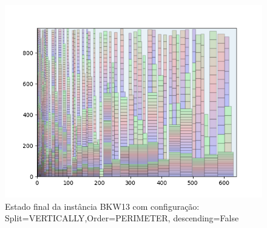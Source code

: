 \begin{figure}[H]
    \centering
    \caption[]{Estado final da instância BKW13 com configuração: Split=VERTICALLY,Order=PERIMETER, descending=False}
    \label{fig:bkw13-vertically-perimeter-false}
    \includegraphics[scale=0.5]{output/figures/bkw/bkw13/vertically/perimeter/false/0000}
\end{figure}